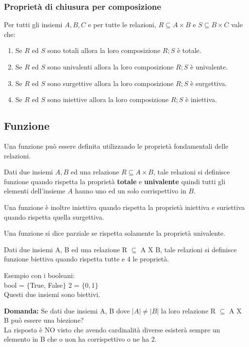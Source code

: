 
\subsubsection{Proprietà di chiusura per composizione}
Per tutti gli insiemi $A, B, C$ e per tutte le relazioni, $R \subseteq A \times B$ e $S \subseteq B \times C$ vale che:
\begin{enumerate}
    \item Se $R$ ed $S$ sono totali allora la loro composizione $R;S$ è totale.
    \item Se $R$ ed $S$ sono univalenti allora la loro composizione $R;S$ è univalente.
    \item Se $R$ ed $S$ sono surgettive allora la loro composizione $R;S$ è surgettiva.
    \item Se $R$ ed $S$ sono iniettive allora la loro composizione $R;S$ è iniettiva.
\end{enumerate}

\subsection{Funzione}
Una funzione può essere definita utilizzando le proprietà fondamentali delle relazioni.
\begin{definition}[Funzione]
Dati due insiemi $A, B$ ed una relazione $R \subseteq A \times B$, tale relazioni si definisce funzione quando rispetta la proprietà \textbf{totale} e \textbf{univalente} quindi tutti gli elementi dell'insieme $A$ hanno uno ed un solo corrispettivo in $B$.
\end{definition}

Una funzione è inoltre iniettiva quando rispetta la proprietà iniettiva e suriettiva quando rispetta quella surgettiva.
\begin{definition}
    Una funzione si dice parziale se rispetta solamente la proprietà univalente.
\end{definition}
\begin{definition}[Biezione]
Dati due insiemi A, B ed una relazione R $\subseteq$ A X B, tale relazioni si definisce funzione biettiva quando rispetta tutte e 4 le proprietà.
\end{definition}
\begin{example}
    Esempio con i booleani:\\
    bool = $\{$True, False$\}$ \hspace{1cm} 2 = $\{0, 1\}$\\
    Questi due insiemi sono biettivi.
\end{example}
\textbf{Domanda:} Se dati due insiemi A, B dove $|A| \neq |B|$ la loro relazione R $\subseteq$ A X B può essere una biezione?\\
La risposta è NO visto che avendo cardinalità diverse esisterà sempre un elemento in B che o non ha corrispettivo o ne ha 2.

